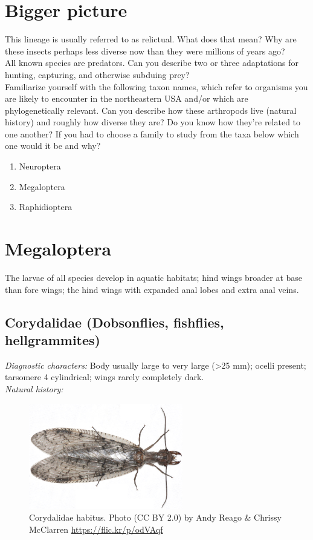 \documentclass[letterpaper, 11pt]{article}
\begin{document}
\section*{Bigger picture}
This lineage is usually referred to as relictual. What does that mean? Why are these insects perhaps less diverse now than they were millions of years ago?\\

\noindent{}All known species are predators. Can you describe two or three adaptations for hunting, capturing, and otherwise subduing prey?\\

\noindent{}Familiarize yourself with the following taxon names, which refer to organisms you are likely to encounter in the northeastern USA and/or which are phylogenetically relevant. Can you describe how these arthropods live (natural history) and roughly how diverse they are? Do you know how they're related to one another? If you had to choose a family to study from the taxa below which one would it be and why?
\begin{enumerate} 
\item Neuroptera  
\item Megaloptera
\item Raphidioptera
\end{enumerate}

\section{Megaloptera}
The larvae of all species develop in aquatic habitats;
 hind wings broader at base than fore wings; the hind wings with expanded anal lobes and extra anal veins.\\

\subsection{Corydalidae (Dobsonflies, fishflies, hellgrammites)}

\noindent{}\textit{Diagnostic characters:} Body usually large to very large (\textgreater25 mm); ocelli present; tarsomere 4 cylindrical; wings rarely completely dark.\\

\noindent{}\textit{Natural history:}\\

\begin{figure}[ht!]
  \centering
    \includegraphics[width=0.6\textwidth]{CorydalidHabitus}
\caption{Corydalidae habitus. Photo (CC BY 2.0) by Andy Reago \& Chrissy McClarren \url{https://flic.kr/p/odVAqf}}
  \label{fig:corydalid}
\end{figure}
\end{document}
